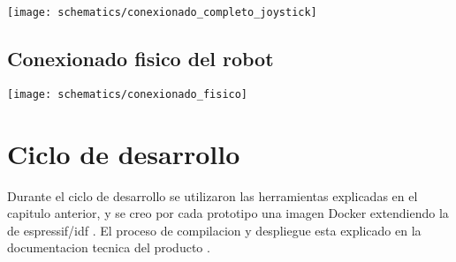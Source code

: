 \begin{center}
  \texttt{[image: schematics/conexionado\_completo\_joystick]}
    \label{fig:conexionado_completo_joystick}
\end{center}





\subsection{Conexionado fisico del robot}

\begin{center}
  \texttt{[image: schematics/conexionado\_fisico]}
    \label{fig:conexionado_fisico}
\end{center}



\section{Ciclo de desarrollo}

Durante el ciclo de desarrollo se utilizaron las herramientas explicadas en el capitulo anterior, y se creo por cada prototipo una imagen Docker extendiendo la de espressif/idf \cite{Espressif_docker_image}. El proceso de compilacion y despliegue esta explicado en la documentacion tecnica del producto \cite{Robot_Tecnical_doc}.


